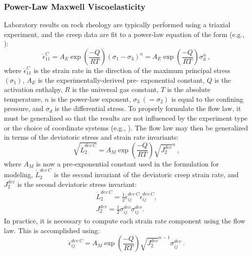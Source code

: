 \subsubsection{Power-Law Maxwell Viscoelasticity}
Laboratory results on rock rheology are typically performed using a
triaxial experiment, and the creep data are fit to a power-law
equation of the form (e.g., \cite{Kirby:Kronenberg:1987}):
\begin{equation}
  \dot{\epsilon}_{11}^{C}=A_{E}\exp\left(\frac{-Q}{RT}\right)\left(\sigma_{1}-\sigma_{3}\right)^{n}=A_{E}\exp\left(\frac{-Q}{RT}\right)\sigma_{d}^{n}\:,
\end{equation}
where $\dot{\epsilon}_{11}^{C}$ is the strain rate in the direction of
the maximum principal stress $\left({\sigma}_1\right)$, $A_{E}$ is the
experimentally-derived pre- exponential constant, $Q$ is the
activation enthalpy, $R$ is the universal gas constant, $T$ is the
absolute temperature, $n$ is the power-law exponent,
$\sigma_{3}\:\left(=\sigma_{2}\right)$ is equal to the confining
pressure, and $\sigma_{d}$ is the differential stress. To properly
formulate the flow law, it must be generalized so that the results are
not influenced by the experiment type or the choice of coordinate
systems (e.g., \cite{Paterson:1994}). The flow law may then be
generalized in terms of the deviatoric stress and strain rate
invariants:
\begin{equation}
  \sqrt{\dot{L}_{2}^{dev\:
      C}}=A_{M}\exp\left(\frac{-Q}{RT}\right)\sqrt{J_{2}^{dev}}^{n}\:,
\end{equation} where $A_{M}$ is now a pre-exponential constant used in
the formulation for modeling, $\dot{L}_{2}^{dev\:C}$ is the second
invariant of the deviatoric creep strain rate, and $J_{2}^{dev}$ is the
second deviatoric stress invariant:
\begin{gather}
  \dot{L}_{2}^{dev\:
    C}=\frac{1}{2}\dot{\epsilon}_{ij}^{dev\:C}\dot{\epsilon}_{ij}^{dev\:C},\\
  J_{2}^{dev}=\frac{1}{2}\sigma_{ij}^{dev}\sigma_{ij}^{dev}.
\end{gather}
In practice, it is necessary to compute each strain
rate component using the flow law. This is accomplished using:
\begin{equation}
  \dot{\epsilon}_{ij}^{dev\:C}=A_{M}\exp\left(\frac{-Q}{RT}\right)\sqrt{J_{2}^{dev}}^{n-1}\sigma_{ij}^{dev}\:.
\end{equation}
  
